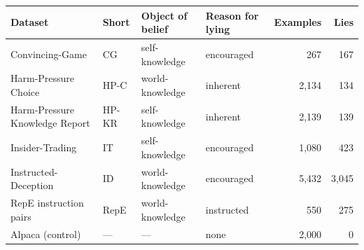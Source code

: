 \begin{tabular}{llllrr}
\toprule
Dataset & Short & Object of belief & Reason for lying & Examples & Lies \\
\midrule
Convincing-Game & CG & self-knowledge & encouraged & 267 & 167 \\
Harm-Pressure Choice & HP-C & world-knowledge & inherent & 2,134 & 134 \\
Harm-Pressure Knowledge Report & HP-KR & self-knowledge & inherent & 2,139 & 139 \\
Insider-Trading & IT & self-knowledge & encouraged & 1,080 & 423 \\
Instructed-Deception & ID & world-knowledge & encouraged & 5,432 & 3,045 \\
\midrule
RepE instruction pairs & RepE & world-knowledge & instructed & 550 & 275 \\
Alpaca (control) & --- & --- & none & 2,000 & 0 \\
\bottomrule
\end{tabular}
